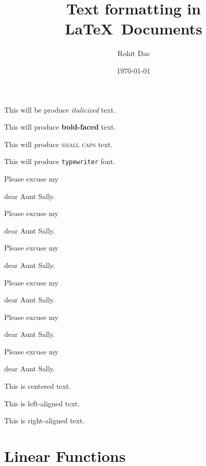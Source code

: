 \documentclass[11pt]{article}
\begin{document}
\tableofcontents

\title{Text formatting in \LaTeX \ Documents}
\author{Rohit Das}
\date{\today}
\maketitle

This will be produce \textit{italicized} text.

This will produce \textbf{bold-faced} text.

This will produce \textsc{small caps} text.

This will produce \texttt{typewriter} font.

Please excuse my \begin{tiny}
dear Aunt Sally.
\end{tiny}

Please excuse my \begin{small}
dear Aunt Sally.
\end{small}

Please excuse my \begin{large}
dear Aunt Sally.
\end{large}

Please excuse my \begin{Large}
dear Aunt Sally.
\end{Large}

Please excuse my \begin{huge}
dear Aunt Sally.
\end{huge}

Please excuse my \begin{Huge}
dear Aunt Sally.
\end{Huge}

\begin{center}
This is centered text.
\end{center}

\begin{flushleft}
This is left-aligned text.
\end{flushleft}

\begin{flushright}
This is right-aligned text.
\end{flushright}

\section{Linear Functions}
\end{document}
